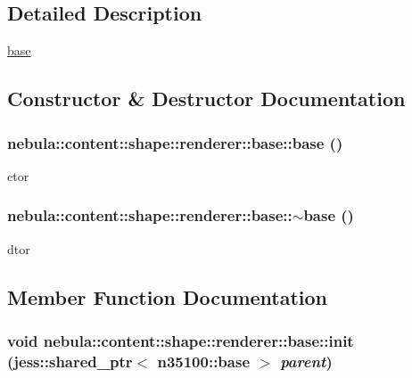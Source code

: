 \subsection{Detailed Description}
\hyperlink{classnebula_1_1content_1_1shape_1_1renderer_1_1base}{base} 

\subsection{Constructor \& Destructor Documentation}
\hypertarget{classnebula_1_1content_1_1shape_1_1renderer_1_1base_a92cb9592da6a0f4a71df83f163330f8b}{
\subsubsection[{base}]{\setlength{\rightskip}{0pt plus 5cm}nebula::content::shape::renderer::base::base ()}}
\label{classnebula_1_1content_1_1shape_1_1renderer_1_1base_a92cb9592da6a0f4a71df83f163330f8b}


ctor \hypertarget{classnebula_1_1content_1_1shape_1_1renderer_1_1base_a8dbb5bad65da86bdecc66c6cac6f0e3b}{
\subsubsection[{$\sim$base}]{\setlength{\rightskip}{0pt plus 5cm}nebula::content::shape::renderer::base::$\sim$base ()}}
\label{classnebula_1_1content_1_1shape_1_1renderer_1_1base_a8dbb5bad65da86bdecc66c6cac6f0e3b}


dtor 

\subsection{Member Function Documentation}
\hypertarget{classnebula_1_1content_1_1shape_1_1renderer_1_1base_a23ca4a9ed061df97755b6d845533ce1f}{
\subsubsection[{init}]{\setlength{\rightskip}{0pt plus 5cm}void nebula::content::shape::renderer::base::init (jess::shared\_\-ptr$<$ {\bf n35100::base} $>$ {\em parent})}}
\label{classnebula_1_1content_1_1shape_1_1renderer_1_1base_a23ca4a9ed061df97755b6d845533ce1f}


